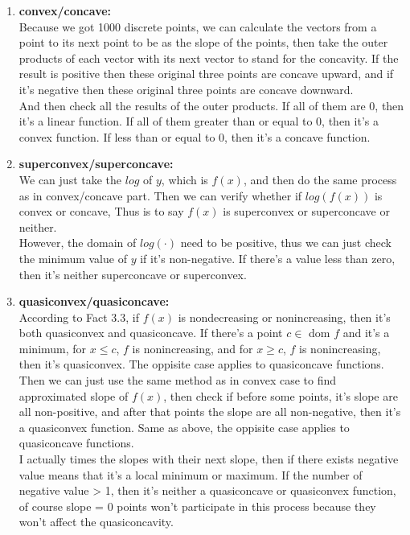 \documentclass[a4paper, onecolumn, , 11pt]{IEEEtran}
\begin{document}
    \begin{enumerate}
        \item \textbf{convex/concave:} \\
            Because we got 1000 discrete points, we can 
            calculate the vectors from a point to its next point to be as the 
            slope of the points, then take the outer products of each vector with 
            its next vector to stand for the concavity. If the result is positive
            then these original three points are concave upward, and if it's negative 
            then these original three points are concave downward. \\
            And then check all the 
            results of the outer products. If all of them are 0, then it's a linear
            function. If all of them greater than or equal to 0, then it's a convex
            function. If less than or equal to 0, then it's a concave function.
        \item \textbf{superconvex/superconcave:} \\
            We can just take the $log$ of $y$, which is $f(x)$, and then do the same 
            process as in convex/concave part. Then we can verify whether if 
            $log(f(x))$ is convex or concave, Thus is to say $f(x)$ is superconvex 
            or superconcave or neither. \\
            However, the  domain of $log(\cdot)$ need to be positive, 
            thus we can just check the minimum value of $y$ if it's non-negative.
            If there's a value less than zero, then it's neither superconcave or 
            superconvex.
        \item \textbf{quasiconvex/quasiconcave:} \\
            According to Fact 3.3, if $f(x)$ is nondecreasing or nonincreasing,
            then it's both quasiconvex and quasiconcave. If there's a point 
            $c \in$ dom $f$ and it's a minimum, for $x \leq c$, $f$ is 
            nonincreasing, and for $x \geq c$, $f$ is nonincreasing, then it's 
            quasiconvex. The oppisite case applies to quasiconcave functions.\\
            Then we can just use the same method as in convex case to find 
            approximated slope of $f(x)$, then check if before some points, it's
            slope are all non-positive, and after that points the slope are all
            non-negative, then it's a quasiconvex function. Same as above,
            the oppisite case applies to quasiconcave functions.\\
            I actually times the slopes with their next slope, then if there 
            exists negative value means that it's a local minimum or maximum.
            If the number of negative value > 1, then it's neither a
            quasiconcave or quasiconvex function, of course slope = 0 points
            won't participate in this process because they won't affect the
            quasiconcavity.\\
    \end{enumerate}
\end{document}
